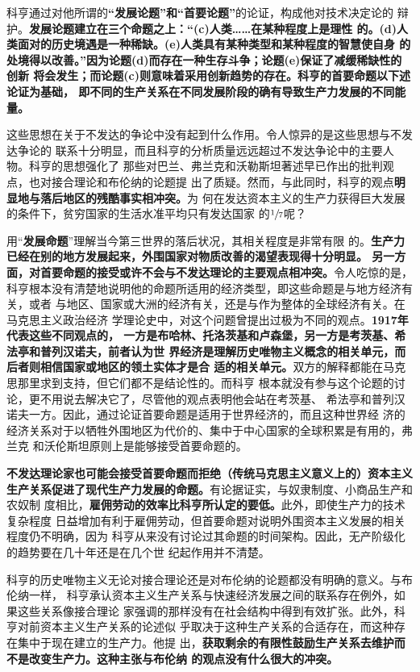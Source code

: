 科亨通过对他所谓的\textbf{“发展论题”和“首要论题”}的论证，构成他对技术决定论的
辩护。\textbf{发展论题建立在三个命题之上：“(c)人类……在某种程度上是理性
  的。(d)人类面对的历史境遇是一种稀缺。(e)人类具有某种类型和某种程度的智慧使自身
  的处境得以改善。”因为论题(d)而存在一种生存斗争；论题(e)保证了减缓稀缺性的创新
  将会发生；而论题(c)则意味着采用创新趋势的存在。科亨的首要命题以下述论证为基础，
  即不同的生产关系在不同发展阶段的确有导致生产力发展的不同能量。}

这些思想在关于不发达的争论中没有起到什么作用。令人惊异的是这些思想与不发达争论的
联系十分明显，而且科亨的分析质量远远超过不发达争论中的主要人物。科亨的思想强化了
那些对巴兰、弗兰克和沃勒斯坦著述早已作出的批判观点，也对接合理论和布伦纳的论题提
出了质疑。然而，与此同时，科亨的观点\textbf{明显地与落后地区的残酷事实相冲突。}为
何在发达资本主义的生产力获得巨大发展的条件下，贫穷国家的生活水准平均只有发达国家
的$\sfrac{1}{7}$呢？

用“\textbf{发展命题}”理解当今第三世界的落后状况，其相关程度是非常有限
的。\textbf{生产力已经在别的地方发展起来，外围国家对物质改善的渴望表现得十分明显。
  另一方面，对首要命题的接受或许不会与不发达理论的主要观点相冲突。}令人吃惊的是，
科亨根本没有清楚地说明他的命题所适用的经济类型，即这些命题是与地方经济有关，或者
与地区、国家或大洲的经济有关，还是与作为整体的全球经济有关。在马克思主义政治经济
学理论史中，对这个问题曾提出过极为不同的观点。\textbf{1917年代表这些不同观点的，
  一方是布哈林、托洛茨基和卢森堡，另一方是考茨基、希法亭和普列汉诺夫，前者认为世
  界经济是理解历史唯物主义概念的相关单元，而后者则相信国家或地区的领土实体才是合
  适的相关单元。}双方的解释都能在马克思那里求到支持，但它们都不是结论性的。而科亨
根本就没有参与这个论题的讨论，更不用说去解决它了，尽管他的观点表明他会站在考茨基、
希法亭和普列汉诺夫一方。因此，通过论证首要命题是适用于世界经济的，而且这种世界经
济的经济关系对于以牺牲外围地区为代价的、集中于中心国家的全球积累是有用的，弗兰克
和沃伦斯坦原则上是能够接受首要命题的。

\textbf{不发达理论家也可能会接受首要命题而拒绝（传统马克思主义意义上的）资本主义
  生产关系促进了现代生产力发展的命题。}有论据证实，与奴隶制度、小商品生产和农奴制
度相比，\textbf{雇佣劳动的效率比科亨所认定的要低。}此外，即使生产力的技术复杂程度
日益增加有利于雇佣劳动，但首要命题对说明外围资本主义发展的相关程度仍不明确，因为
科亨从来没有讨论过其命题的时间架构。因此，无产阶级化的趋势要在几十年还是在几个世
纪起作用并不清楚。

科亨的历史唯物主义无论对接合理论还是对布伦纳的论题都没有明确的意义。与布伦纳一样，
科亨承认资本主义生产关系与快速经济发展之间的联系存在例外，如果这些关系像接合理论
家强调的那样没有在社会结构中得到有效扩张。此外，科亨对前资本主义生产关系的论述似
乎取决于这种生产关系的合适存在，而这种存在集中于现在建立的生产力。他提
出，\textbf{获取剩余的有限性鼓励生产关系去维护而不是改变生产力。这种主张与布伦纳
  的观点没有什么很大的冲突。}

